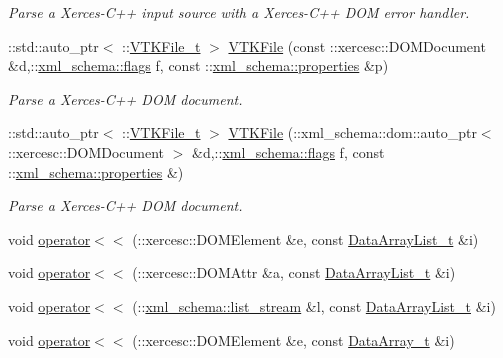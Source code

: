 \begin{DoxyCompactItemize}
\begin{DoxyCompactList}\small\item\em Parse a Xerces-\/\-C++ input source with a Xerces-\/\-C++ D\-O\-M error handler. \end{DoxyCompactList}\item 
\-::std\-::auto\-\_\-ptr$<$ \-::\hyperlink{classVTKFile__t}{V\-T\-K\-File\-\_\-t} $>$ \hyperlink{vtk-unstructured_8cpp_a5cfc26d05bba2c6e23c17478e8178ddb}{V\-T\-K\-File} (const \-::xercesc\-::\-D\-O\-M\-Document \&d,\-::\hyperlink{namespacexml__schema_a8d981c127a1f5106d04ad5853e707361}{xml\-\_\-schema\-::flags} f, const \-::\hyperlink{namespacexml__schema_aba199bc39c8b21c427369c27d2bcfc8c}{xml\-\_\-schema\-::properties} \&p)
\begin{DoxyCompactList}\small\item\em Parse a Xerces-\/\-C++ D\-O\-M document. \end{DoxyCompactList}\item 
\-::std\-::auto\-\_\-ptr$<$ \-::\hyperlink{classVTKFile__t}{V\-T\-K\-File\-\_\-t} $>$ \hyperlink{vtk-unstructured_8cpp_a47eb5ec0aafb0ac2a5cd332db8f6a8af}{V\-T\-K\-File} (\-::xml\-\_\-schema\-::dom\-::auto\-\_\-ptr$<$ \-::xercesc\-::\-D\-O\-M\-Document $>$ \&d,\-::\hyperlink{namespacexml__schema_a8d981c127a1f5106d04ad5853e707361}{xml\-\_\-schema\-::flags} f, const \-::\hyperlink{namespacexml__schema_aba199bc39c8b21c427369c27d2bcfc8c}{xml\-\_\-schema\-::properties} \&)
\begin{DoxyCompactList}\small\item\em Parse a Xerces-\/\-C++ D\-O\-M document. \end{DoxyCompactList}\item 
void \hyperlink{vtk-unstructured_8cpp_a61ab4b44692dc25fbed88bd01294b3a6}{operator$<$$<$} (\-::xercesc\-::\-D\-O\-M\-Element \&e, const \hyperlink{classDataArrayList__t}{Data\-Array\-List\-\_\-t} \&i)
\item 
void \hyperlink{vtk-unstructured_8cpp_a7630c2ebfb09fec59ec9744ab4de05a1}{operator$<$$<$} (\-::xercesc\-::\-D\-O\-M\-Attr \&a, const \hyperlink{classDataArrayList__t}{Data\-Array\-List\-\_\-t} \&i)
\item 
void \hyperlink{vtk-unstructured_8cpp_a15e37609fa21b26bacce23662c522124}{operator$<$$<$} (\-::\hyperlink{namespacexml__schema_ab6c818ac91e70a25620375e0d000be83}{xml\-\_\-schema\-::list\-\_\-stream} \&l, const \hyperlink{classDataArrayList__t}{Data\-Array\-List\-\_\-t} \&i)
\item 
void \hyperlink{vtk-unstructured_8cpp_a90ac4d883593f3e71cc24b0c8a53f745}{operator$<$$<$} (\-::xercesc\-::\-D\-O\-M\-Element \&e, const \hyperlink{classDataArray__t}{Data\-Array\-\_\-t} \&i)

\end{DoxyCompactItemize}
